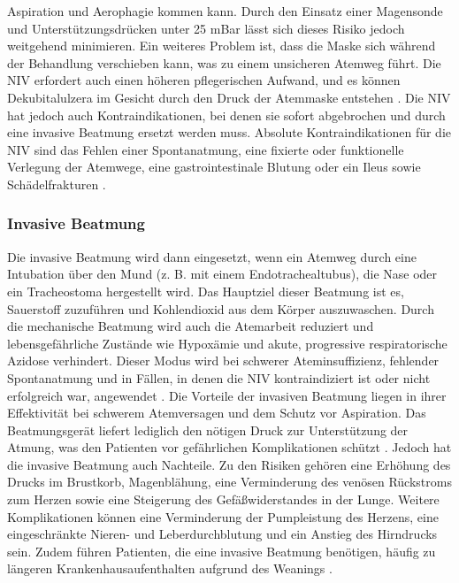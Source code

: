 \documentclass[a4paper,12pt]{article}
\begin{document}
Aspiration und Aerophagie kommen kann. Durch den Einsatz einer Magensonde und Unterstützungsdrücken
unter 25 mBar lässt sich dieses Risiko jedoch weitgehend minimieren. Ein weiteres Problem ist, dass die
Maske sich während der Behandlung verschieben kann, was zu einem unsicheren Atemweg führt. Die NIV erfordert
auch einen höheren pflegerischen Aufwand, und es können Dekubitalulzera im Gesicht durch den Druck der
Atemmaske entstehen \cite{doccheckNichtinvasiveBeatmung}.
Die NIV hat jedoch auch Kontraindikationen, bei denen sie sofort abgebrochen und durch eine invasive
Beatmung ersetzt werden muss. Absolute Kontraindikationen für die NIV sind das Fehlen einer
Spontanatmung, eine fixierte oder funktionelle Verlegung der Atemwege, eine gastrointestinale Blutung
oder ein Ileus sowie Schädelfrakturen \cite{doccheckNichtinvasiveBeatmung}.

\subsubsection{Invasive Beatmung}

Die invasive Beatmung wird dann eingesetzt, wenn ein Atemweg durch eine Intubation über den Mund
(z. B. mit einem Endotrachealtubus), die Nase oder ein Tracheostoma hergestellt wird. Das Hauptziel
dieser Beatmung ist es, Sauerstoff zuzuführen und Kohlendioxid aus dem Körper auszuwaschen. Durch
die mechanische Beatmung wird auch die Atemarbeit reduziert und lebensgefährliche Zustände wie
Hypoxämie und akute, progressive respiratorische Azidose verhindert. Dieser Modus wird bei schwerer
Ateminsuffizienz, fehlender Spontanatmung und in Fällen, in denen die NIV kontraindiziert ist oder
nicht erfolgreich war, angewendet \cite{InvasiveUndNichtinvasive}.
Die Vorteile der invasiven Beatmung liegen in ihrer Effektivität bei schwerem Atemversagen und
dem Schutz vor Aspiration. Das Beatmungsgerät liefert lediglich den nötigen Druck zur Unterstützung
der Atmung, was den Patienten vor gefährlichen Komplikationen schützt \cite{InvasiveBeatmung}.
Jedoch hat die invasive Beatmung auch Nachteile. Zu den Risiken gehören eine Erhöhung des Drucks
im Brustkorb, Magenblähung, eine Verminderung des venösen Rückstroms zum Herzen sowie eine
Steigerung des Gefäßwiderstandes in der Lunge. Weitere Komplikationen können eine Verminderung der
Pumpleistung des Herzens, eine eingeschränkte Nieren- und Leberdurchblutung und ein Anstieg des
Hirndrucks sein. Zudem führen Patienten, die eine invasive Beatmung benötigen, häufig zu längeren
Krankenhausaufenthalten aufgrund des Weanings \cite{KuenstlicheBeatmungGruende2022}.
\end{document}
